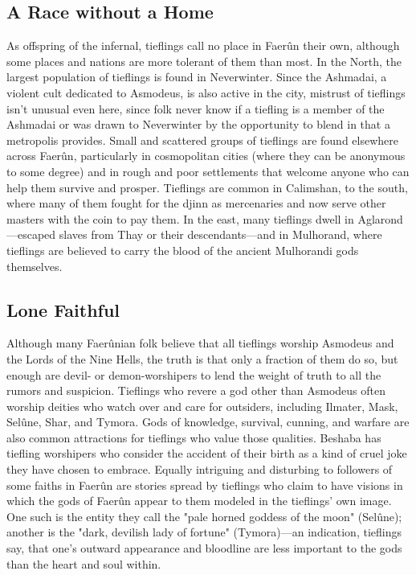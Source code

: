 \documentclass[10pt,a4paper,twoside,twocolumn,openany,bg=print,nodeprecatedcode]{dndbook}
\begin{document}
\subsection{A Race without a Home}
As offspring of the infernal, tieflings call no place in Faerûn their own, although some places and nations are more tolerant of them than most.
In the North, the largest population of tieflings is found in Neverwinter. Since the Ashmadai, a violent cult dedicated to Asmodeus, is also active in the city, mistrust of tieflings isn't unusual even here, since folk never know if a tiefling is a member of the Ashmadai or was drawn to Neverwinter by the opportunity to blend in that a metropolis provides.
Small and scattered groups of tieflings are found elsewhere across Faerûn, particularly in cosmopolitan cities (where they can be anonymous to some degree) and in rough and poor settlements that welcome anyone who can help them survive and prosper.
Tieflings are common in Calimshan, to the south, where many of them fought for the djinn as mercenaries and now serve other masters with the coin to pay them. In the east, many tieflings dwell in Aglarond—escaped slaves from Thay or their descendants—and in Mulhorand, where tieflings are believed to carry the blood of the ancient Mulhorandi gods themselves.
\subsection{Lone Faithful}
Although many Faerûnian folk believe that all tieflings worship Asmodeus and the Lords of the Nine Hells, the truth is that only a fraction of them do so, but enough are devil- or demon-worshipers to lend the weight of truth to all the rumors and suspicion.
Tieflings who revere a god other than Asmodeus often worship deities who watch over and care for outsiders, including Ilmater, Mask, Selûne, Shar, and Tymora. Gods of knowledge, survival, cunning, and warfare are also common attractions for tieflings who value those qualities. Beshaba has tiefling worshipers who consider the accident of their birth as a kind of cruel joke they have chosen to embrace.
Equally intriguing and disturbing to followers of some faiths in Faerûn are stories spread by tieflings who claim to have visions in which the gods of Faerûn appear to them modeled in the tieflings' own image. One such is the entity they call the "pale horned goddess of the moon" (Selûne); another is the "dark, devilish lady of fortune" (Tymora)—an indication, tieflings say, that one's outward appearance and bloodline are less important to the gods than the heart and soul within.
\end{document}
